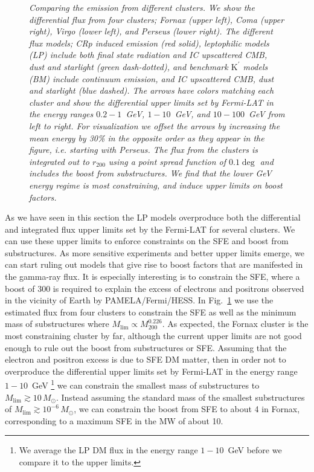 \documentclass[10pt,aps,pra,reprint,amsmath,amsfonts,amssymb,showpacs]{revtex4-1}
\newcommand{\rmn}{\mathrm}
\newcommand{\msun}{M_\odot}
\newcommand{\Kp}{\rmn{K}^\prime}
\newcommand{\rvir}{r_{200}}
\newcommand{\mvir}{M_{200}}
\begin{document}
\begin{figure}
\begin{minipage}{2.0\columnwidth}
\caption{\it Comparing the emission from different clusters. We show
  the differential flux from four clusters; Fornax (upper left), Coma
  (upper right), Virgo (lower left), and Perseus (lower right). The
  different flux models; CRp induced emission (red solid), leptophilic
  models (LP) include both final state radiation and IC upscattered
  CMB, dust and starlight (green dash-dotted), and benchmark $\Kp$
  models (BM) include continuum emission, and IC upscattered CMB, dust
  and starlight (blue dashed). The arrows have colors matching each
  cluster and show the differential upper limits set by Fermi-LAT in
  the energy ranges $0.2-1$~GeV, $1-10$~GeV, and $10-100$~GeV from
  left to right. For visualization we offset the arrows by increasing
  the mean energy by 30\% in the opposite order as they appear in the
  figure, i.e. starting with Perseus. The flux from the clusters is
  integrated out to $\rvir$ using a point spread function of $0.1\deg$
  and includes the boost from substructures. We find that the lower
  GeV energy regime is most constraining, and induce upper limits on
  boost factors.}
 \label{fig:clu_comp}
\end{minipage}
\end{figure}

As we have seen in this section the LP models overproduce both the
differential and integrated flux upper limits set by the Fermi-LAT for
several clusters. We can use these upper limits to enforce constraints
on the SFE and boost from substructures. As more sensitive experiments
and better upper limits emerge, we can start ruling out models that
give rise to boost factors that are manifested in the gamma-ray
flux. It is especially interesting is to constrain the SFE, where a
boost of 300 is required to explain the excess of electrons and
positrons observed in the vicinity of Earth by PAMELA/Fermi/HESS.  In
Fig.~\ref{fig:clu_comp} we use the estimated flux from four clusters
to constrain the SFE as well as the minimum mass of substructures
where $M_\rmn{lim}\propto\mvir^{0.226}$. As expected, the Fornax
cluster is the most constraining cluster by far, although the current
upper limits are not good enough to rule out the boost from
substructures or SFE. Assuming that the electron and positron excess
is due to SFE DM matter, then in order not to overproduce the
differential upper limits set by Fermi-LAT in the energy range
$1-10$~GeV \footnote{We average the LP DM flux in the energy range
  $1-10$~GeV before we compare it to the upper limits.}  we can
constrain the smallest mass of substructures to $M_\rmn{lim}\gtrsim
10\,\msun$. Instead assuming the standard mass of the smallest
substructures of $M_\rmn{lim}\gtrsim 10^{-6}\,\msun$, we can constrain
the boost from SFE to about 4 in Fornax, corresponding to a maximum
SFE in the MW of about 10.
\end{document}
